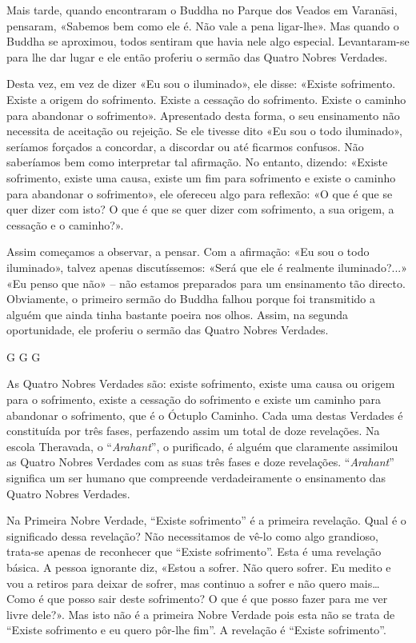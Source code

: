 Mais tarde, quando encontraram o Buddha no Parque dos Veados em Varanāsi,
pensaram, «Sabemos bem como ele é. Não vale a pena ligar-lhe». Mas quando o
Buddha se aproximou, todos sentiram que havia nele algo especial. Levantaram-se
para lhe dar lugar e ele então proferiu o sermão das Quatro Nobres Verdades.

Desta vez, em vez de dizer «Eu sou o iluminado», ele disse: «Existe sofrimento.
Existe a origem do sofrimento. Existe a cessação do sofrimento. Existe o caminho
para abandonar o sofrimento». Apresentado desta forma, o seu ensinamento não
necessita de aceitação ou rejeição. Se ele tivesse dito «Eu sou o todo
iluminado», seríamos forçados a concordar, a discordar ou até ficarmos confusos.
Não saberíamos bem como interpretar tal afirmação. No entanto, dizendo: «Existe
sofrimento, existe uma causa, existe um fim para sofrimento e existe o caminho
para abandonar o sofrimento», ele ofereceu algo para reflexão: «O que é que se
quer dizer com isto? O que é que se quer dizer com sofrimento, a sua origem, a
cessação e o caminho?».

Assim começamos a observar, a pensar. Com a afirmação: «Eu sou o todo
iluminado», talvez apenas discutíssemos: «Será que ele é realmente
iluminado?...» «Eu penso que não» – não estamos preparados para um ensinamento
tão directo. Obviamente, o primeiro sermão do Buddha falhou porque foi
transmitido a alguém que ainda tinha bastante poeira nos olhos. Assim, na
segunda oportunidade, ele proferiu o sermão das Quatro Nobres Verdades.


G G G

As Quatro Nobres Verdades são: existe sofrimento, existe uma causa ou origem
para o sofrimento, existe a cessação do sofrimento e existe um caminho para
abandonar o sofrimento, que é o Óctuplo Caminho. Cada uma destas Verdades é
constituída por três fases, perfazendo assim um total de doze revelações. Na
escola Theravada, o “\emph{Arahant}”, o purificado, é alguém que claramente
assimilou as Quatro Nobres Verdades com as suas três fases e doze revelações.
“\emph{Arahant}” significa um ser humano que compreende verdadeiramente o
ensinamento das Quatro Nobres Verdades.

Na Primeira Nobre Verdade, “Existe sofrimento” é a primeira revelação. Qual é o
significado dessa revelação? Não necessitamos de vê-lo como algo grandioso,
trata-se apenas de reconhecer que “Existe sofrimento”. Esta é uma revelação
básica. A pessoa ignorante diz, «Estou a sofrer. Não quero sofrer. Eu medito e
vou a retiros para deixar de sofrer, mas continuo a sofrer e não quero
mais\ldots{} Como é que posso sair deste sofrimento? O que é que posso fazer
para me ver livre dele?». Mas isto não é a primeira Nobre Verdade pois esta não
se trata de “Existe sofrimento e eu quero pôr-lhe fim”. A revelação é “Existe
sofrimento”.

